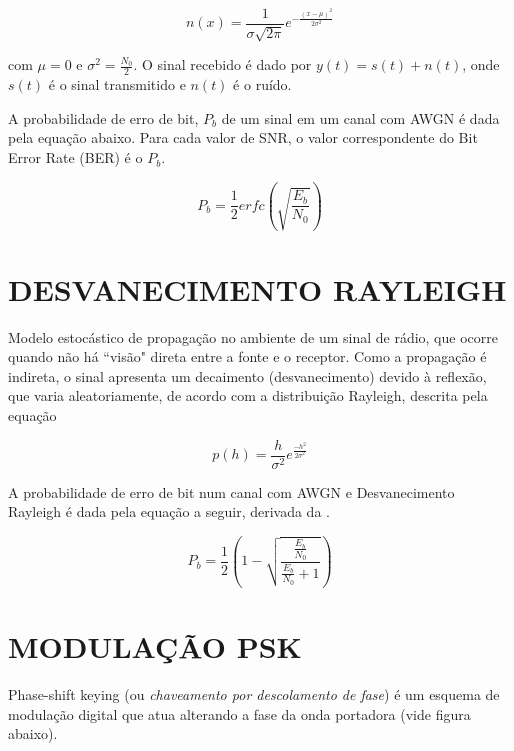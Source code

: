 \documentclass[a4paper,twocolumn]{article}
\begin{document}
\begin{equation}
    \label{eq:awgn}
    n(x) = \frac{1}{\sigma \sqrt{2\pi}} e^{- \frac{(x - \mu)^2}{2\sigma^2}}
\end{equation}

\noindent com $\mu = 0$ e $\sigma^2 = \frac{N_0}{2}$. O sinal recebido é dado por $y(t) = s(t) + n(t)$, onde $s(t)$ é o sinal transmitido e $n(t)$ é o ruído.

A probabilidade de erro de bit, $P_b$ de um sinal em um canal com AWGN é dada pela equação abaixo. Para cada valor de SNR, o valor correspondente do Bit Error Rate (BER) é o $P_b$.

\begin{equation}
    \label{eq:bit_error_prob}
    P_b = \frac{1}{2}erfc(\sqrt{\frac{E_b}{N_0}})
\end{equation}


\section{DESVANECIMENTO RAYLEIGH}

Modelo estocástico de propagação no ambiente de um sinal de rádio, que ocorre quando não há ``visão" direta entre a fonte e o receptor. Como a propagação é indireta, o sinal apresenta um decaimento (desvanecimento) devido à reflexão, que varia aleatoriamente, de acordo com a distribuição Rayleigh, descrita pela equação

\begin{equation}
    \label{eq:rayleigh_dist}
    p(h) = \frac{h}{\sigma^2}e^\frac{-h^2}{2\sigma^2}
\end{equation}

A probabilidade de erro de bit num canal com AWGN e Desvanecimento Rayleigh é dada pela equação a seguir, derivada da .

\begin{equation}
    \label{eq:rayleigh_bit_error_prob}
    P_b = \frac{1}{2}(1 - \sqrt{\frac{\frac{E_b}{N_0}}{\frac{E_b}{N_0} + 1}})
\end{equation}


\section{MODULAÇÃO PSK}

Phase-shift keying (ou \textit{chaveamento por descolamento de fase}) é um esquema de modulação digital que atua alterando a fase da onda portadora (vide figura abaixo).
\end{document}
